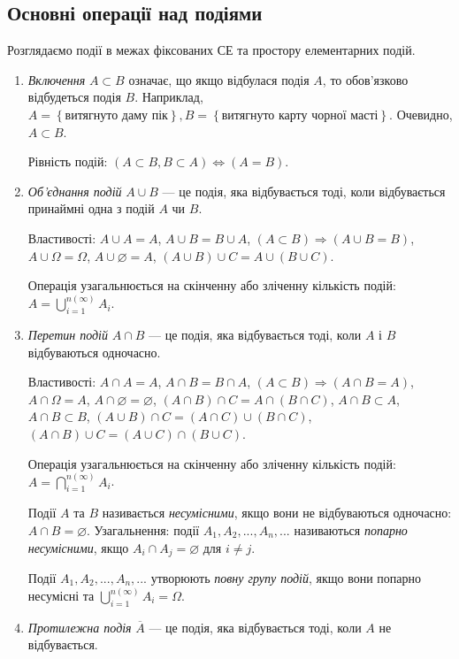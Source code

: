 \subsection{Основні операції над подіями}
\begin{remark}
    Розглядаємо події в межах фіксованих СЕ та простору елементарних подій.
\end{remark}
\begin{enumerate}
    \item \emph{Включення} $A \subset B$ означає, що якщо відбулася подія $A$, то обов'язково відбудеться подія $B$.
    Наприклад, $A = \left\{\text{витягнуто даму пік}\right\}, B = \left\{\text{витягнуто карту чорної масті}\right\}$. 
    Очевидно, $A\subset B$.

    Рівність подій: $\left( A \subset B, B \subset A \right) \iff \left( A = B\right)$.
    \item \emph{Об'єднання подій} $A \cup B$ --- це подія, яка відбувається тоді, коли відбувається
    принаймні одна з подій $A$ чи $B$.

    Властивості: $A \cup A = A$,  $A \cup B = B \cup A$, $\left( A \subset B \right) \Rightarrow \left( A \cup B = B \right)$, 
    $A \cup \Omega = \Omega$, $A \cup \varnothing = A$, $\left( A \cup B \right) \cup C = A \cup \left( B \cup C \right)$.

    Операція узагальнюється на скінченну або зліченну кількість подій: $A = \bigcup_{i=1}^{n \left( \infty \right)} A_i$.
    \item \emph{Перетин подій} $A \cap B$ --- це подія, яка відбувається тоді, коли $A$ і $B$ відбуваються одночасно.

    Властивості: $A \cap A = A$,  $A \cap B = B \cap A$, $\left( A \subset B \right) \Rightarrow \left( A \cap B = A \right)$, 
    $A \cap \Omega = A$, $A \cap \varnothing = \varnothing$, $\left( A \cap B \right) \cap C = A \cap \left( B \cap C \right)$,
    $A \cap B \subset A$, $A \cap B \subset B$, $\left( A \cup B \right) \cap C = \left( A \cap C \right) \cup \left( B \cap C \right)$,
    $\left( A \cap B \right) \cup C = \left( A \cup C \right) \cap \left( B \cup C \right)$.

    Операція узагальнюється на скінченну або зліченну кількість подій: $A = \bigcap_{i=1}^{n \left( \infty \right)} A_i$.
    \begin{definition}
        Події $A$ та $B$ називається \emph{несумісними}, якщо вони не відбуваються одночасно: $A \cap B = \varnothing$.
        Узагальнення: події $A_1, A_2, ..., A_n, ...$ називаються \emph{попарно несумісними}, якщо $A_i \cap A_j = \varnothing$ для $i \neq j$.
    \end{definition}
    \begin{definition}
        Події $A_1, A_2, ..., A_n, ...$ утворюють \emph{повну групу подій}, якщо вони попарно несумісні 
        та $\bigcup_{i=1}^{n \left( \infty \right)} A_i = \Omega$.
    \end{definition}
    \item \emph{Протилежна подія} $\overline{A}$ --- це подія, яка відбувається тоді, коли $A$ не відбувається.
    

\end{enumerate}
